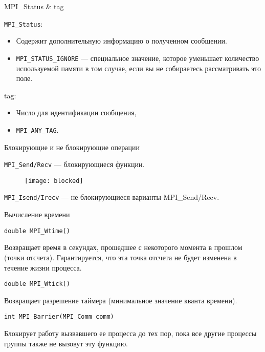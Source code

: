 \begin{frame}{MPI_Status \& tag}

\texttt{MPI_Status}:

\begin{itemize}
    \item Содержит дополнительную информацию о полученном сообщении.
    \item \texttt{MPI_STATUS_IGNORE} --- специальное значение, которое уменьшает количество используемой памяти в том случае, если вы не собираетесь рассматривать это поле.
\end{itemize}

\vfill

tag:

\begin{itemize}
    \item Число для идентификации сообщения,
    \item \texttt{MPI_ANY_TAG}.
\end{itemize}

\end{frame}

\begin{frame}{Блокирующие и не блокирующие операции}

\texttt{MPI_Send/Recv} --- блокирующиеся функции.

\begin{figure}[htp]
    \centering
    \texttt{[image: blocked]}
\end{figure}

\texttt{MPI_Isend/Irecv} --- не блокирующиеся варианты MPI_Send/Recv.

\end{frame}

\begin{frame}[fragile]{Вычисление времени}

\begin{lstlisting}
double MPI_Wtime()
\end{lstlisting}

Возвращает время в секундах, прошедшее с  некоторого момента в прошлом (точки отсчета). Гарантируется, что эта точка отсчета не будет изменена в течение жизни процесса.

\begin{lstlisting}
double MPI_Wtick()
\end{lstlisting}

Возвращает разрешение таймера (минимальное значение кванта времени). 

\begin{lstlisting}
int MPI_Barrier(MPI_Comm comm)
\end{lstlisting}

Блокирует работу вызвавшего ее процесса до тех пор, пока все другие процессы группы также не вызовут эту функцию.

\end{frame}

